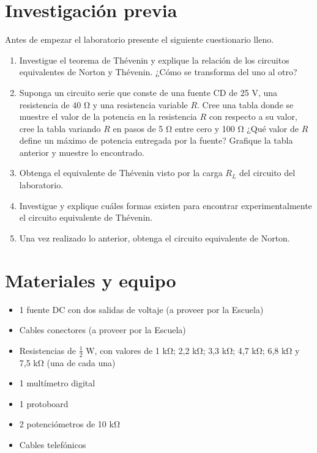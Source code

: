 \documentclass[12pt,letterpaper]{report}
\newcommand{\inv}{Investigación previa}
\newcommand{\mat}{Materiales y equipo}
\newcommand{\antesde}{Antes de empezar el laboratorio presente el siguiente cuestionario lleno.}
\begin{document}
\section{\inv}
\antesde
\begin{enumerate}
\item Investigue el teorema de Thévenin y explique la relación de los circuitos
equivalentes de Norton y Thévenin. ¿Cómo se transforma del uno al otro?
\item Suponga un circuito serie que conste de una fuente CD de 25 V, una
resistencia de 40 \si{\ohm} y una resistencia variable $R$. Cree una tabla donde se
muestre el valor de la potencia en la resistencia $R$ con respecto a su valor,
cree la tabla variando $R$ en pasos de 5 \si{\ohm} entre cero y 100 \si{\ohm} ¿Qué valor de $R$ define un máximo de potencia entregada por la fuente? Grafique la tabla
anterior y muestre lo encontrado.
\item Obtenga el equivalente de Thévenin visto por la carga $R_L$ del circuito del
laboratorio.
\item Investigue y explique cuáles formas existen para encontrar experimentalmente el circuito equivalente de Thévenin.
\item Una vez realizado lo anterior, obtenga el circuito equivalente de Norton.
\end{enumerate}

\section{\mat}
\begin{itemize}
\item 1 fuente DC con dos salidas de voltaje (a proveer por la Escuela)
\item Cables conectores (a proveer por la Escuela)
\item Resistencias de $\frac{1}{2}$ \si{\watt}, con valores de 1 \si{\kilo\ohm}; 2,2 \si{\kilo\ohm}; 3,3 \si{\kilo\ohm}; 4,7 \si{\kilo\ohm}; 6,8 \si{\kilo\ohm} y
7,5 \si{\kilo\ohm} (una de cada una)
\item 1 multímetro digital
\item 1 protoboard
\item 2 potenciómetros de 10 \si{\kilo\ohm}
\item Cables telefónicos
\end{itemize}
\end{document}
